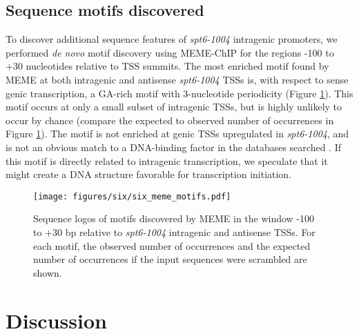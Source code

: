 \subsection{Sequence motifs discovered}

To discover additional sequence features of \textit{spt6-1004} intragenic promoters, we performed \textit{de novo} motif discovery using MEME-ChIP \citep{machanick2011} for the regions -100 to +30 nucleotides relative to TSS summits.
The most enriched motif found by MEME at both intragenic and antisense \textit{spt6-1004} TSSs is, with respect to sense genic transcription, a GA-rich motif with 3-nucleotide periodicity (Figure \ref{fig:six_meme_motifs}).
This motif occurs at only a small subset of intragenic TSSs, but is highly unlikely to occur by chance (compare the expected to observed number of occurrences in Figure \ref{fig:six_meme_motifs}).
The motif is not enriched at genic TSSs upregulated in \textit{spt6-1004}, and is not an obvious match to a DNA-binding factor in the databases searched \citep{deboer2011,macisaac2006,newburger2008,pachkov2013,teixeira2017,zhu1999,weirauch2014}.
If this motif is directly related to intragenic transcription, we speculate that it might create a DNA structure favorable for transcription initiation.

\begin{figure}[h]
    \centering
    \texttt{[image: figures/six/six\_meme\_motifs.pdf]}
    \caption[Sequence logos of motifs discovered by MEME upstream of \textit{spt6-1004}-induced intragenic and antisense TSSs.]{Sequence logos of motifs discovered by MEME \citep{bailey2015} in the window -100 to +30 bp relative to \textit{spt6-1004} intragenic and antisense TSSs. For each motif, the observed number of occurrences and the expected number of occurrences if the input sequences were scrambled are shown.}
    \label{fig:six_meme_motifs}
\end{figure}

\section{Discussion}

